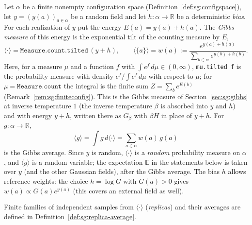 \begin{definition}\label{def:sg:gibbs-yh}
Let $\alpha$ be a finite nonempty configuration space (Definition~\ref{def:sg:configspace}), let $y=(y(a))_{a\in\alpha}$ be a
random field and let $h:\alpha\to\mathbb R$ be a deterministic \emph{bias}. For each realization of $y$ put the energy
$E(a)=y(a)+h(a)$. The \emph{Gibbs measure} of this energy is the exponential tilt of the counting measure by $E$,
\[\langle\cdot\rangle=\texttt{Measure.count.tilted}\,(y+h),\qquad
\langle\{a\}\rangle=w(a):=\frac{e^{y(a)+h(a)}}{\sum_{b\in\alpha}e^{y(b)+h(b)}}.\]
Here, for a measure $\mu$ and a function $f$ with $\int e^f\,d\mu\in(0,\infty)$, \texttt{mu.tilted f} is the probability measure
with density $e^{f}/\int e^f\,d\mu$ with respect to $\mu$; for $\mu=\texttt{Measure.count}$ the integral is the finite sum
$Z=\sum_be^{E(b)}$ (Remark~\ref{rem:sg:finiteconfig}). This is the Gibbs measure of Section~\ref{sec:sg:gibbs} at inverse
temperature $1$ (the inverse temperature $\beta$ is absorbed into $y$ and $h$) and with energy $y+h$, written there as
$G_\beta$ with $\beta H$ in place of $y+h$. For $g:\alpha\to\mathbb R$,
\[\langle g\rangle=\int g\,d\langle\cdot\rangle=\sum_{a\in\alpha}w(a)\,g(a)\]
is the Gibbs average. Since $y$ is random, $\langle\cdot\rangle$ is a \emph{random} probability measure on $\alpha$, and $\langle g\rangle$
is a random variable; the expectation $\mathbb E$ in the statements below is taken over $y$ (and the other Gaussian fields), after
the Gibbs average. The bias $h$ allows reference weights: the choice $h=\log G$ with $G(a)>0$ gives
$w(a)\propto G(a)e^{y(a)}$ (this covers an external field as well).

Finite families of independent samples from $\langle\cdot\rangle$ (\emph{replicas}) and their averages are defined in
Definition~\ref{def:sg:replica-average}.
\end{definition}

